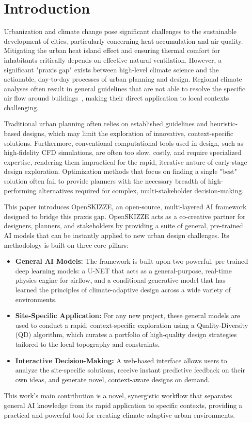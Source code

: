 \documentclass[times,final]{elsarticle}
\begin{document}
\section{Introduction}

Urbanization and climate change pose significant challenges to the sustainable development of cities, particularly concerning heat accumulation and air quality. Mitigating the urban heat island effect and ensuring thermal comfort for inhabitants critically depends on effective natural ventilation. However, a significant "praxis gap" exists between high-level climate science and the actionable, day-to-day processes of urban planning and design. Regional climate analyses often result in general guidelines that are not able to resolve the specific air flow around buildings~\cite{Kruse2018lanuv}, making their direct application to local contexts challenging.

Traditional urban planning often relies on established guidelines and heuristic-based designs, which may limit the exploration of innovative, context-specific solutions. Furthermore, conventional computational tools used in design, such as high-fidelity CFD simulations, are often too slow, costly, and require specialized expertise, rendering them impractical for the rapid, iterative nature of early-stage design exploration. Optimization methods that focus on finding a single "best" solution often fail to provide planners with the necessary breadth of high-performing alternatives required for complex, multi-stakeholder decision-making.

This paper introduces OpenSKIZZE, an open-source, multi-layered AI framework designed to bridge this praxis gap. OpenSKIZZE acts as a co-creative partner for designers, planners, and stakeholders by providing a suite of general, pre-trained AI models that can be instantly applied to new urban design challenges. Its methodology is built on three core pillars:
\begin{itemize}
    \item \textbf{General AI Models:} The framework is built upon two powerful, pre-trained deep learning models: a U-NET that acts as a general-purpose, real-time physics engine for airflow, and a conditional generative model that has learned the principles of climate-adaptive design across a wide variety of environments.
    \item \textbf{Site-Specific Application:} For any new project, these general models are used to conduct a rapid, context-specific exploration using a Quality-Diversity (QD) algorithm, which curates a portfolio of high-quality design strategies tailored to the local topography and constraints.
    \item \textbf{Interactive Decision-Making:} A web-based interface allows users to analyze the site-specific solutions, receive instant predictive feedback on their own ideas, and generate novel, context-aware designs on demand.
\end{itemize}
This work's main contribution is a novel, synergistic workflow that separates general AI knowledge from its rapid application to specific contexts, providing a practical and powerful tool for creating climate-adaptive urban environments.
\end{document}
